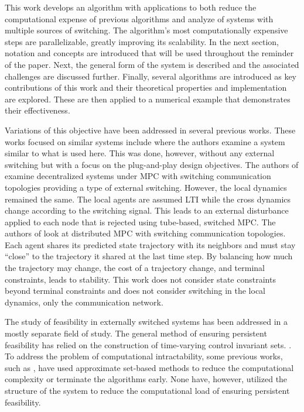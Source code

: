 This work develops an algorithm with applications to both reduce the computational expense of previous algorithms and analyze of systems with multiple sources of switching. The algorithm's most computationally expensive steps are parallelizable, greatly improving its scalability. In the next section, notation and concepts are introduced that will be used throughout the reminder of the paper. Next, the general form of the system is described and the associated challenges are discussed further. Finally, several algorithms are introduced as key contributions of this work and their theoretical properties and implementation are explored. These are then applied to a numerical example that demonstrates their effectiveness. 

Variations of this objective have been addressed in several previous works. These works focused on similar systems include \cite{Riverso2015} where the authors examine a system similar to what is used here. This was done, however, without any external switching but with a focus on the plug-and-play design objectives. The authors of \cite{Ahandani2020} examine decentralized systems under MPC with switching communication topologies providing a type of external switching. However, the local dynamics remained the same. The local agents are assumed LTI while the cross dynamics change according to the switching signal. This leads to an external disturbance applied to each node that is rejected using tube-based, switched MPC. The authors of \cite{Li2020} look at distributed MPC with switching communication topologies. Each agent shares its predicted state trajectory with its neighbors and must stay ``close'' to the trajectory it shared at the last time step. By balancing how much the trajectory may change, the cost of a trajectory change, and terminal constraints, leads to stability. This work does not consider state constraints beyond terminal constraints and does not consider switching in the local dynamics, only the communication network. 

The study of feasibility in externally switched systems has been addressed in a mostly separate field of study. The general method of ensuring persistent feasibility has relied on the construction of time-varying control invariant sets. \cite{Santis2004, Zhang2014, Danielson2019}. To address the problem of computational intractability, some previous works, such as \cite{Santis2004}, have used approximate set-based methods to reduce the computational complexity or terminate the algorithms early. None have, however, utilized the structure of the system to reduce the computational load of ensuring persistent feasibility. 